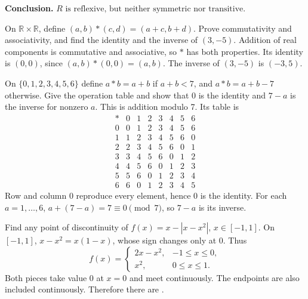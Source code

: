 \begin{enumerate}[label={},leftmargin=0pt,itemsep=9pt]
\textbf{Conclusion.} $\boxed{R\text{ is reflexive, but neither symmetric nor transitive.}}$

 On $\mathbb R\times\mathbb R$, define $(a,b)*(c,d)=(a+c,b+d)$. Prove commutativity and associativity, and find the identity and the inverse of $(3,-5)$.
\solution Addition of real components is commutative and associative, so $*$ has both properties. Its identity is $\boxed{(0,0)}$, since $(a,b)*(0,0)=(a,b)$. The inverse of $(3,-5)$ is $\boxed{(-3,5)}$.

 On $\{0,1,2,3,4,5,6\}$ define $a*b=a+b$ if $a+b<7$, and $a*b=a+b-7$ otherwise. Give the operation table and show that 0 is the identity and $7-a$ is the inverse for nonzero $a$.
\solution This is addition modulo 7. Its table is
\[
\begin{array}{c|rrrrrrr}
* &0&1&2&3&4&5&6\\\hline
0&0&1&2&3&4&5&6\\
1&1&2&3&4&5&6&0\\
2&2&3&4&5&6&0&1\\
3&3&4&5&6&0&1&2\\
4&4&5&6&0&1&2&3\\
5&5&6&0&1&2&3&4\\
6&6&0&1&2&3&4&5
\end{array}
\]
Row and column 0 reproduce every element, hence 0 is the identity. For each $a=1,\ldots,6$, $a+(7-a)=7\equiv0\pmod7$, so $7-a$ is its inverse.

 Find any point of discontinuity of $f(x)=x-|x-x^2|$, $x\in[-1,1]$.
\solution On $[-1,1]$, $x-x^2=x(1-x)$, whose sign changes only at 0. Thus
\[
f(x)=\begin{cases}2x-x^2,&-1\le x\le0,\\x^2,&0\le x\le1.\end{cases}
\]
Both pieces take value 0 at $x=0$ and meet continuously. The endpoints are also included continuously. Therefore there are .
\end{enumerate}

